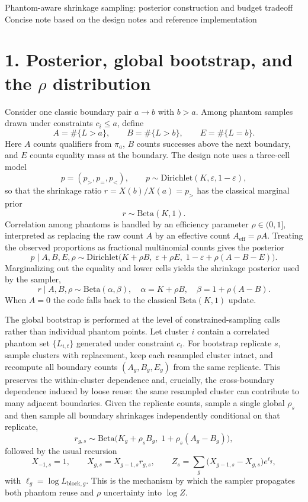 \documentclass[10pt]{article}
\begin{document}
\small

\begin{center}
{\Large Phantom-aware shrinkage sampling: posterior construction and budget tradeoff}\\[2mm]
{\normalsize Concise note based on the design notes and reference implementation}
\end{center}

\section*{1. Posterior, global bootstrap, and the $\rho$ distribution}

Consider one classic boundary pair $a \to b$ with $b>a$. Among phantom samples drawn under constraints $c_i \le a$, define
\[
A = \#\{L>a\},\qquad B = \#\{L>b\},\qquad E = \#\{L=b\}.
\]
Here $A$ counts qualifiers from $\pi_a$, $B$ counts successes above the next boundary, and $E$ counts equality mass at the boundary. The design note uses a three-cell model
\[
p=(p_>,p_=,p_<),\qquad p \sim \mathrm{Dirichlet}(K,\varepsilon,1-\varepsilon),
\]
so that the shrinkage ratio $r = X(b)/X(a)=p_>$ has the classical marginal prior
\[
r \sim \mathrm{Beta}(K,1).
\]
Correlation among phantoms is handled by an efficiency parameter $\rho\in(0,1]$, interpreted as replacing the raw count $A$ by an effective count $A_{\mathrm{eff}}=\rho A$. Treating the observed proportions as fractional multinomial counts gives the posterior
\[
p\mid A,B,E,\rho \sim \mathrm{Dirichlet}\bigl(K+\rho B,\;\varepsilon+\rho E,\;1-\varepsilon+\rho(A-B-E)\bigr).
\]
Marginalizing out the equality and lower cells yields the shrinkage posterior used by the sampler,
\[
\boxed{\;r\mid A,B,\rho \sim \mathrm{Beta}(\alpha,\beta),\quad
\alpha=K+\rho B,\quad \beta=1+\rho(A-B).\;}
\]
When $A=0$ the code falls back to the classical $\mathrm{Beta}(K,1)$ update.

The global bootstrap is performed at the level of constrained-sampling calls rather than individual phantom points. Let cluster $i$ contain a correlated phantom set $\{L_{i,t}\}$ generated under constraint $c_i$. For bootstrap replicate $s$, sample clusters with replacement, keep each resampled cluster intact, and recompute all boundary counts $(A_g,B_g,E_g)$ from the same replicate. This preserves the within-cluster dependence and, crucially, the cross-boundary dependence induced by loose reuse: the same resampled cluster can contribute to many adjacent boundaries. Given the replicate counts, sample a single global $\rho_s$ and then sample all boundary shrinkages independently conditional on that replicate,
\[
r_{g,s}\sim \mathrm{Beta}\bigl(K_g+\rho_s B_g,\;1+\rho_s(A_g-B_g)\bigr),
\]
followed by the usual recursion
\[
X_{-1,s}=1,\qquad X_{g,s}=X_{g-1,s}r_{g,s},\qquad
Z_s=\sum_g \bigl(X_{g-1,s}-X_{g,s}\bigr)e^{\ell_g},
\]
with $\ell_g=\log L_{\text{block},g}$. This is the mechanism by which the sampler propagates both phantom reuse and $\rho$ uncertainty into $\log Z$.
\end{document}
